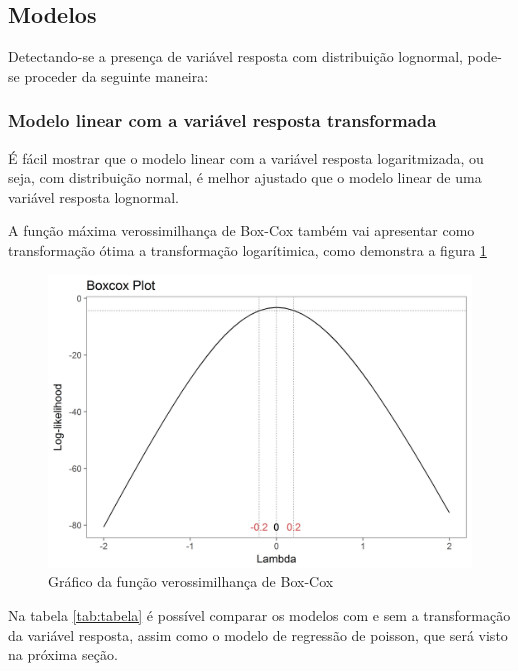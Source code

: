 \documentclass[a4paper]{article}
\begin{document}
\subsection{Modelos}\label{modelos}

Detectando-se a presença de variável resposta com distribuição
lognormal, pode-se proceder da seguinte maneira:

\subsubsection{Modelo linear com a variável resposta
transformada}\label{modelo-linear-com-a-variavel-resposta-transformada}

É fácil mostrar que o modelo linear com a variável resposta
logaritmizada, ou seja, com distribuição normal, é melhor ajustado que o
modelo linear de uma variável resposta lognormal.

A função máxima verossimilhança de Box-Cox também vai apresentar como
transformação ótima a transformação logarítimica, como demonstra a
figura \ref{fig:boxcox}

\begin{figure}[H]

{\centering \includegraphics[width=0.7\linewidth]{images/boxcox-1} 

}

\caption{Gráfico da função verossimilhança de Box-Cox}\label{fig:boxcox}
\end{figure}

Na tabela \ref{tab:tabela} é possível comparar os modelos com e sem a
transformação da variável resposta, assim como o modelo de regressão de
poisson, que será visto na próxima seção.
\end{document}
